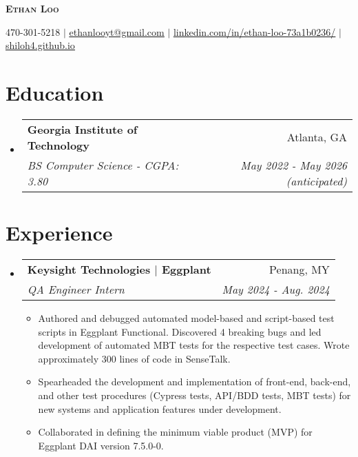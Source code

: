 \documentclass[letterpaper,11pt]{article}
\makeatletter
\newcommand{\resumeItem}[1]{
  \item\small{
    {#1 \vspace{-2pt}}
  }
}
\newcommand{\resumeSubheading}[4]{
  \vspace{-2pt}\item
    \begin{tabular*}{0.97\textwidth}[t]{l@{\extracolsep{\fill}}r}
      \textbf{#1} & #2 \\
      \textit{\small#3} & \textit{\small #4} \\
    \end{tabular*}\vspace{-7pt}
}
\newcommand{\resumeSubHeadingListStart}{\begin{itemize}[leftmargin=0.15in, label={}]}
\newcommand{\resumeSubHeadingListEnd}{\end{itemize}}
\newcommand{\resumeItemListStart}{\begin{itemize}}
\newcommand{\resumeItemListEnd}{\end{itemize}\vspace{-8pt}}
\makeatother
\begin{document}
\begin{center}
  \vspace*{-25pt}
    \textbf{\huge \scshape Ethan Loo}
  \vspace*{-9pt}
\end{center}

\begin{center}
\small 470-301-5218 $|$
\href{mailto:ethanlooyt@gmail.com}{\underline{ethanlooyt@gmail.com}} $|$
\href{https://www.linkedin.com/in/ethan-loo-73a1b0236/}{\underline{linkedin.com/in/ethan-loo-73a1b0236/}} $|$
\href{https://shiloh4.github.io/}{\underline{shiloh4.github.io}}
\vspace*{-10pt}
\end{center}


\section{Education}
  \resumeSubHeadingListStart
    \resumeSubheading
      {Georgia Institute of Technology}{Atlanta, GA}
      {BS Computer Science - CGPA: 3.80}{May 2022 - May 2026 (anticipated)}
  \resumeSubHeadingListEnd

\section{Experience}
\resumeSubHeadingListStart

  \resumeSubheading
    {Keysight Technologies $|$ Eggplant}{Penang, MY}
    {QA Engineer Intern}{May 2024 - Aug. 2024}
    \resumeItemListStart
      \resumeItem{Authored and debugged automated model-based and script-based test scripts in Eggplant Functional. Discovered 4 breaking bugs and led development of automated MBT tests for the respective test cases. Wrote approximately 300 lines of code in SenseTalk.}
      \resumeItem{Spearheaded the development and implementation of front-end, back-end, and other test procedures (Cypress tests, API/BDD tests, MBT tests) for new systems and application features under development.}
      \resumeItem{Collaborated in defining the minimum viable product (MVP) for Eggplant DAI version 7.5.0-0.}
    \resumeItemListEnd

\resumeSubHeadingListEnd


\end{document}
